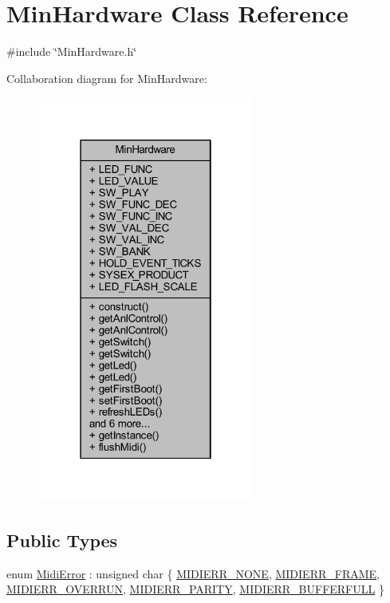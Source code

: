 \hypertarget{class_min_hardware}{}\section{Min\+Hardware Class Reference}
\label{class_min_hardware}


{\ttfamily \#include \char`\"{}Min\+Hardware.\+h\char`\"{}}



Collaboration diagram for Min\+Hardware\+:
\nopagebreak
\begin{figure}[H]
\begin{center}
\leavevmode
\includegraphics[width=202pt]{dc/d75/class_min_hardware__coll__graph}
\end{center}
\end{figure}
\subsection*{Public Types}
\begin{DoxyCompactItemize}
\item 
enum \hyperlink{class_min_hardware_a54ab3625bd44e1b95ba30816a6923c4a}{Midi\+Error} \+: unsigned char \{ \newline
\hyperlink{class_min_hardware_a54ab3625bd44e1b95ba30816a6923c4aa14ef09bb9e2c3ad44e4ef5d46417ebd7}{M\+I\+D\+I\+E\+R\+R\+\_\+\+N\+O\+NE}, 
\hyperlink{class_min_hardware_a54ab3625bd44e1b95ba30816a6923c4aa251e8dcc629d40ce6bbb792ec2a78586}{M\+I\+D\+I\+E\+R\+R\+\_\+\+F\+R\+A\+ME}, 
\hyperlink{class_min_hardware_a54ab3625bd44e1b95ba30816a6923c4aaf2bd267c8e20542d3439b4276878bc6d}{M\+I\+D\+I\+E\+R\+R\+\_\+\+O\+V\+E\+R\+R\+UN}, 
\hyperlink{class_min_hardware_a54ab3625bd44e1b95ba30816a6923c4aa5535af14f4bc70bc09b986c17d659911}{M\+I\+D\+I\+E\+R\+R\+\_\+\+P\+A\+R\+I\+TY}, 
\newline
\hyperlink{class_min_hardware_a54ab3625bd44e1b95ba30816a6923c4aa05279156222db9e1c979824b564f6da8}{M\+I\+D\+I\+E\+R\+R\+\_\+\+B\+U\+F\+F\+E\+R\+F\+U\+LL}
 \}
\end{DoxyCompactItemize}

